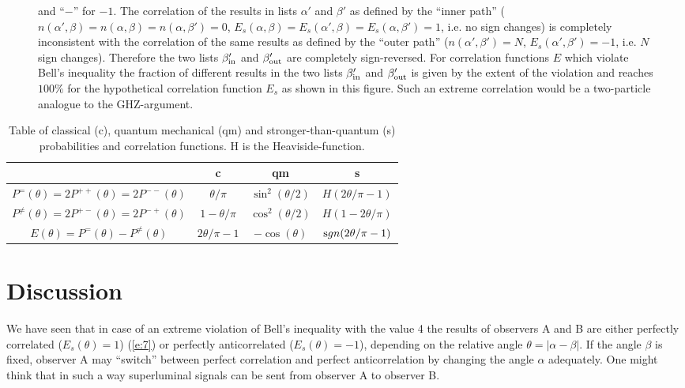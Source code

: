 \begin{figure}
{and ``$-$'' for $-1$.
The correlation of the results in lists $\alpha '$ and
$\beta '$ as defined by the ``inner path''
($n(\alpha ',\beta ) = n(\alpha ,\beta ) =
n(\alpha ,\beta ')=0 $,
$E_s(\alpha , \beta ) = E_s(\alpha ', \beta ) =
E_s(\alpha ,\beta ') = 1$, i.e.
no sign changes) is completely inconsistent
with the correlation of the same results as defined by the
``outer path'' ($n(\alpha ',\beta ') = N$,
$E_s(\alpha ',\beta ')=-1$, i.e. $N$ sign changes).
Therefore the two lists $\beta_{\rm in} '$ and $\beta_{\rm out} '$ are
completely sign-reversed.
For correlation functions $E$ which violate Bell\rq s inequality
the fraction of different results in the two lists $\beta_{\rm in} '$ and
$\beta_{\rm out} '$ is given by the extent of the violation and reaches
$100 \%$ for the hypothetical correlation function $E_s$ as shown in this
figure. Such an extreme correlation would be a two-particle analogue to
the GHZ-argument.
}
\label{f-8}
\end{figure}


\begin {table}[ht]
\begin {center}
\begin {tabular}{|c|c|c|c|}
\hline\hline
& c & qm & s \\
\hline
\hline
$P^=(\theta ) =2P^{++}(\theta )=2P^{--} (\theta )$&  $\theta /
\pi$ &$\sin^2(\theta /
2)$&$H(2\theta / \pi -1)$\\
$P^{\neq} (\theta )=2P^{+-}(\theta )=2P^{-+} (\theta )$&   $1-\theta /
\pi$ &$\cos^2(\theta /
2)$&$H(1-2\theta / \pi)$\\
\hline
\hline
$E(\theta ) = P^=(\theta ) -P^{\neq} (\theta )  $& $2\theta / \pi -1$
&$-\cos({\theta })$&${\mbox sgn}(2\theta / \pi -1 )$\\
\hline
\hline
\end {tabular}
\end {center}
\caption{Table of classical (c), quantum mechanical (qm) and
stronger-than-quantum (s) probabilities and correlation functions. H is the
Heaviside-function.
\label {tab-1}}
\end {table}

\section{Discussion}
We have seen that in case of an extreme violation of Bell's inequality
with the value 4 the results
of observers A and B are either perfectly correlated ($E_s(\theta)=1$)
(\ref{e:7}) or perfectly anticorrelated ($E_s(\theta)= -1$),
depending on the
relative angle $\theta = \vert \alpha - \beta \vert$.
If the angle $\beta$ is fixed, observer A may ``switch'' between perfect
correlation and perfect anticorrelation by changing the angle $\alpha$
adequately. One might think that in such a way superluminal signals can
be sent from observer A to observer B.

